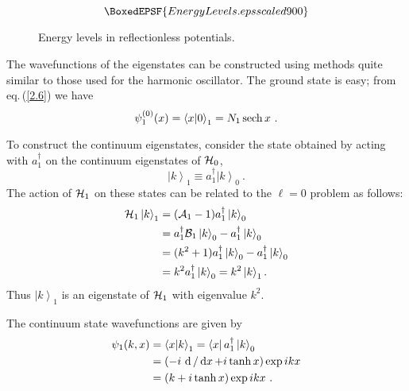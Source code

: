 \documentclass[12pt,twoside]{article}
\newcommand{\sech}{\mathop{\rm sech}\nolimits}
\newcommand{\bra}[1]{\left\langle #1 \right|}
\newcommand{\ket}[1]{\left|#1\right\rangle}
\newcommand{\braket}[2]{\left\langle#1 |  #2\right\rangle}
\newcommand{\rd}[1]{\mathop{\mathrm{d}#1}}
\begin{document}
\begin{figure}[ht]
$$\BoxedEPSF{EnergyLevels.eps scaled 900}$$
\caption{Energy levels in reflectionless potentials.}
\label{samplefig1}
\end{figure}

The wavefunctions of the eigenstates can be constructed using methods quite similar to those used for the harmonic oscillator.  The ground state is easy; from eq.\,(\ref{2.6}) we have %
\begin{equation}
  \psi_1^{(0)}(x) = \braket x0_1 = N_1\sech x\ .   \label{3.6}
\end{equation}
%

To construct the continuum eigenstates, consider the state obtained by acting with $a_1^\dagger$ on the continuum eigenstates of ${\cal H}_0$,
%
\begin{equation}
  \ket k_1 \equiv a_1^\dagger \ket k_0\ .   \label{3.3}
\end{equation}
%
The action of ${\cal H}_1$ on these states can be related to the $\ell=0$ problem as follows:
%
\begin{align}
  {\cal H}_1\ket k_1 &=  ({\cal   A}_1-1)a_1^\dagger \ket k_0\nonumber\\
  &=  a_1^\dagger {\cal   B}_1\ket k_0-a_1^\dagger \ket k_0\nonumber\\
  &= (k^2+1)a_1^\dagger \ket k_0-a_1^\dagger \ket k_0\nonumber\\
  &= k^2a_1^\dagger \ket k_0 = k^2\ket k_1 .
  \label{3.4}
\end{align}
%
Thus $\ket k_1$ is an eigenstate of ${\cal H}_1$ with eigenvalue $k^2$.

The continuum state wavefunctions  are given by
%
\begin{align}
  \psi_1(k,x) &=  \braket xk_1 = \bra x a_1^\dagger \ket k_0\nonumber\\
  &=  (-i\,\rd{\null} /\rd x + i\tanh x)\exp ikx\nonumber\\
  &=  (k+i\tanh x) \exp ikx\ .
  \label{3.7}
\end{align}
%
\end{document}
